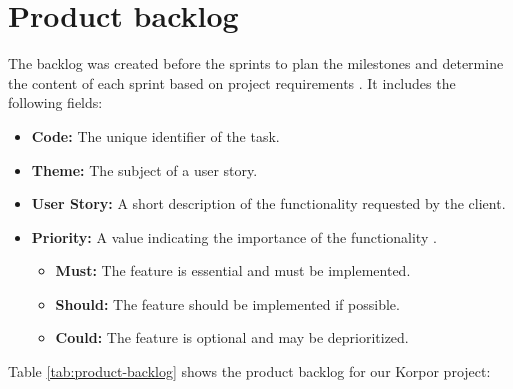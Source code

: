 \section{Product backlog}

The backlog was created before the sprints to plan the milestones and determine the content of each sprint based on project requirements \cite{SchwarzScrum2019}. It includes the following fields:
\begin{itemize}
    \item \textbf{Code:} The unique identifier of the task.
    \item \textbf{Theme:} The subject of a user story.
    \item \textbf{User Story:} A short description of the functionality requested by the client.
    \item \textbf{Priority:} A value indicating the importance of the functionality \cite{MoscowMethodology2021, CleggCaseMethod2004}.
    \begin{itemize}
        \item \textbf{Must:} The feature is essential and must be implemented.
        \item \textbf{Should:} The feature should be implemented if possible.
        \item \textbf{Could:} The feature is optional and may be deprioritized.
   
    \end{itemize}
\end{itemize}

Table \ref{tab:product-backlog} shows the product backlog for our Korpor project:


